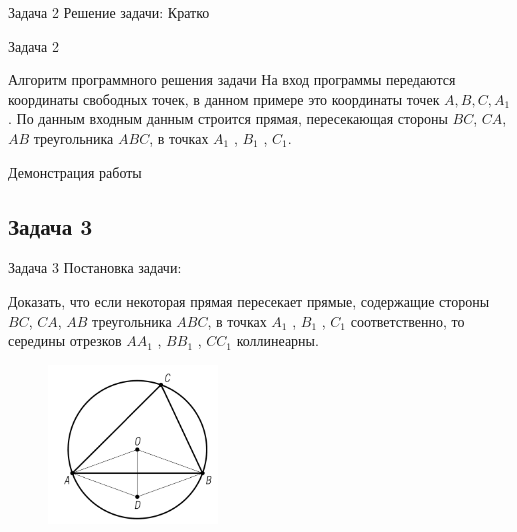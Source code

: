 \documentclass{beamer}
\begin{document}
\begin{frame}
   \begin{block}{Задача 2}
      Решение задачи:
      Кратко
   \end{block}
\end{frame}

\begin{frame}
   \begin{block}{Задача 2}
      \begin{block}{Алгоритм программного решения задачи}
         На вход программы передаются координаты свободных точек, в данном примере это координаты точек \(A,B,C,A_1\). По данным входным данным строится прямая, пересекающая стороны \(BC\), \(CA\), \(AB\) треугольника \(ABC\), в точках \(A_1\) , \(B_1\) , \(C_1\).
      \end{block}
   \end{block}
\end{frame}

\begin{frame}
   Демонстрация работы
\end{frame}

\begin{frame}
   \subsection{Задача 3}
   \begin{block}{Задача 3}
      Постановка задачи:

      Доказать, что если некоторая прямая пересекает прямые, содержащие стороны \(BC\), \(CA\), \(AB\) треугольника \(ABC\), в точках \(A_1\) , \(B_1\) , \(C_1\) соответственно, то середины отрезков \(AA_1\) , \(BB_1\) , \(CC_1\) коллинеарны.

      \begin{figure}[h]
         \centering
         \includegraphics[width=0.4\textwidth]{images/task1.png}
         \label{task3}
      \end{figure}
   \end{block}
\end{frame}
\end{document}
